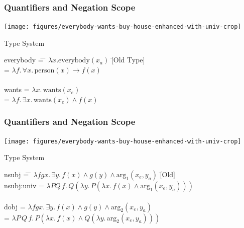 \documentclass[mathserif,12pt]{beamer}
\renewcommand{\land}{\wedge}
\newcommand{\lspace}{.\,}
\begin{document}
\begin{frame}
\frametitle{Quantifiers and Negation Scope}
\centering
\texttt{[image: figures/everybody-wants-buy-house-enhanced-with-univ-crop]}

\begin{block}{\large Type System}
\large
\begin{tabbing}
everybody \= =  \= $\lambda x. \mathrm{everybody}(x_a)$ \hspace{2.8em} \=  [Old Type]\\
\> = \> $\lambda f \lspace \forall x \lspace \mathrm{person}(x) \rightarrow f(x)$   \\

\\

wants \> = \> $\lambda x  \lspace \mathrm{wants}(x_e) $   \\
\> = \> $\lambda f \lspace \exists x \lspace \mathrm{wants}(x_e) \land f(x)$  

\end{tabbing}
\end{block}
\end{frame} 

\begin{frame}
\frametitle{Quantifiers and Negation Scope}
\centering
\texttt{[image: figures/everybody-wants-buy-house-enhanced-with-univ-crop]}

\begin{block}{\large Type System}
\large
\begin{tabbing}
nsubj \hspace{2em} \= =  \= $\lambda f g x\lspace \exists y\lspace f(x) \land g(y) \land \mathrm{arg_1}(x_e, y_a)$ \hspace{2.6em} \=  [Old]\\
nsubj:univ \> = \> $\lambda P Q\, f \lspace Q(\lambda y \lspace P (\lambda x \lspace f(x)  \land \mathrm{arg_1}(x_e,y_a)))$ \> [New]  \\

\\

dobj \> = \> $\lambda f g x\lspace \exists y\lspace f(x) \land g(y) \land \mathrm{arg_2}(x_e, y_a)$ \> [Old] \\
\> = \> $ \lambda P\, Q\, f \lspace P(\lambda x \lspace f(x) \land  Q(\lambda y \lspace \mathrm{arg_2}(x_e,y_a))) $ \> [New] 

\end{tabbing}
\end{block}
\end{frame} 
\end{document}
